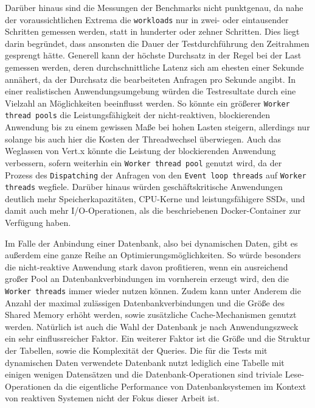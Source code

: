 Darüber hinaus sind die Messungen der Benchmarks nicht punktgenau, da nahe der voraussichtlichen Extrema die \verb|workloads|
nur in zwei- oder eintausender Schritten gemessen werden, statt in hunderter oder zehner Schritten. Dies liegt darin begründet, dass
ansonsten die Dauer der Testdurchführung den Zeitrahmen gesprengt hätte.
Generell kann der höchste Durchsatz in der Regel bei der Last gemessen werden, deren durchschnittliche Latenz sich am ehesten
einer Sekunde annähert, da der Durchsatz die bearbeiteten Anfragen pro Sekunde angibt.
\newline\newline
In einer realistischen Anwendungsumgebung würden die Testresultate durch eine Vielzahl an Möglichkeiten beeinflusst werden.
So könnte ein größerer \verb|Worker thread pools| die Leistungsfähigkeit der nicht-reaktiven, blockierenden
Anwendung bis zu einem gewissen Maße bei hohen Lasten steigern, allerdings nur solange bis auch hier die Kosten der Threadwechsel
überwiegen. Auch das Weglassen von Vert.x könnte die Leistung der blockierenden Anwendung verbessern, sofern weiterhin
ein \verb|Worker thread pool| genutzt wird, da der Prozess des \verb|Dispatching| der Anfragen von den \verb|Event loop threads| auf
\verb|Worker threads| wegfiele. Darüber hinaus würden geschäftskritische Anwendungen deutlich mehr Speicherkapazitäten, CPU-Kerne und
leistungsfähigere SSDs, und damit auch mehr I/O-Operationen, als die beschriebenen Docker-Container zur Verfügung haben.

Im Falle der Anbindung einer Datenbank, also bei dynamischen Daten, gibt es außerdem eine ganze Reihe an Optimierungsmöglichkeiten.
So würde besonders die nicht-reaktive Anwendung stark davon profitieren, wenn ein ausreichend großer Pool an Datenbankverbindungen
im vornherein erzeugt wird, den die \verb|Worker threads| immer wieder nutzen können.
Zudem kann unter Anderem die Anzahl der maximal zulässigen
Datenbankverbindungen und die Größe des Shared Memory erhöht werden, sowie zusätzliche Cache-Mechanismen genutzt werden.
Natürlich ist auch die Wahl der Datenbank je nach Anwendungszweck ein sehr einflussreicher Faktor.
\newline\newline
Ein weiterer Faktor ist die Größe und die Struktur der Tabellen, sowie die Komplexität der Queries.
Die für die Tests mit dynamischen Daten verwendete Datenbank nutzt lediglich eine Tabelle mit einigen wenigen Datensätzen und die
Datenbank-Operationen sind triviale Lese-Operationen
da die eigentliche Performance von Datenbanksystemen im Kontext von reaktiven Systemen nicht der Fokus dieser Arbeit ist.

